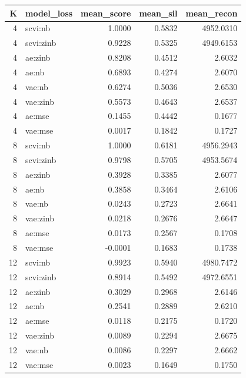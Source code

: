 \begin{tabular}{rlrrr}
\toprule
K & model\_loss & mean\_score & mean\_sil & mean\_recon \\
\midrule
4 & scvi:nb & 1.0000 & 0.5832 & 4952.0310 \\
4 & scvi:zinb & 0.9228 & 0.5325 & 4949.6153 \\
4 & ae:zinb & 0.8208 & 0.4512 & 2.6032 \\
4 & ae:nb & 0.6893 & 0.4274 & 2.6070 \\
4 & vae:nb & 0.6274 & 0.5036 & 2.6530 \\
4 & vae:zinb & 0.5573 & 0.4643 & 2.6537 \\
4 & ae:mse & 0.1455 & 0.4442 & 0.1677 \\
4 & vae:mse & 0.0017 & 0.1842 & 0.1727 \\
8 & scvi:nb & 1.0000 & 0.6181 & 4956.2943 \\
8 & scvi:zinb & 0.9798 & 0.5705 & 4953.5674 \\
8 & ae:zinb & 0.3928 & 0.3385 & 2.6077 \\
8 & ae:nb & 0.3858 & 0.3464 & 2.6106 \\
8 & vae:nb & 0.0243 & 0.2723 & 2.6641 \\
8 & vae:zinb & 0.0218 & 0.2676 & 2.6647 \\
8 & ae:mse & 0.0173 & 0.2567 & 0.1708 \\
8 & vae:mse & -0.0001 & 0.1683 & 0.1738 \\
12 & scvi:nb & 0.9923 & 0.5940 & 4980.7472 \\
12 & scvi:zinb & 0.8914 & 0.5492 & 4972.6551 \\
12 & ae:zinb & 0.3029 & 0.2968 & 2.6146 \\
12 & ae:nb & 0.2541 & 0.2889 & 2.6210 \\
12 & ae:mse & 0.0118 & 0.2175 & 0.1720 \\
12 & vae:zinb & 0.0089 & 0.2294 & 2.6675 \\
12 & vae:nb & 0.0086 & 0.2297 & 2.6662 \\
12 & vae:mse & 0.0023 & 0.1649 & 0.1750 \\
\bottomrule
\end{tabular}
